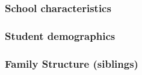 \documentclass{beamer}
\begin{document}
\begin{frame}
    \label{update_scott}
    \frametitle{School characteristics}
 {
    }
\end{frame}

\begin{frame}
    \label{update_scott}
    \frametitle{Student demographics}
 {
    }
\end{frame}

\begin{frame}
    \label{update_scott}
    \frametitle{Family Structure (siblings)}
 {
    }
\end{frame}
\end{document}

